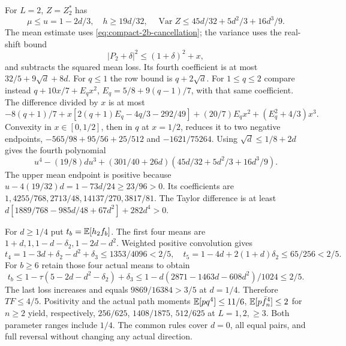 For $L=2$, $Z=Z_2^*$ has
\[
 \mu\le u=1-2d/3,\quad h\ge19d/32,\quad
 \operatorname{Var}Z\le45d/32+5d^2/3+16d^3/9.
\]
The mean estimate uses \eqref{eq:compact-2b-cancellation}; the variance
uses the real-shift bound
\[
 |P_2+\delta|^2\le(1+\delta)^2+x,
\]
and subtracts the squared mean loss. Its fourth coefficient is at most $32/5+9\sqrt d+8d$.
For $q\le1$ the row bound is $q+2\sqrt d$.
For $1\le q\le2$ compare instead
$q+10x/7+E_qx^2$, $E_q=5/8+9(q-1)/7$, with that same coefficient.
The difference divided by $x$ is at most
\[
 -8(q+1)/7+x[2(q+1)E_q-4q/3-292/49]
                  +(20/7)E_qx^2+(E_q^2+4/3)x^3.
\]
Convexity in $x\in[0,1/2]$, then in $q$ at $x=1/2$, reduces it
to two negative endpoints, $-565/98+95/56+25/512$ and $-1621/75264$.
Using $\sqrt d\le1/8+2d$ gives the fourth polynomial
\[
 u^4-(19/8)du^3+(301/40+26d)(45d/32+5d^2/3+16d^3/9).
\]
The upper mean endpoint is positive because
$u-4(19/32)d=1-73d/24\ge23/96>0$.
Its coefficients are $1,4255/768,2713/48,14137/270,3817/81$.
The Taylor difference is at least
$d[1889/768-985d/48+67d^2]+282d^4>0$.

For $d\ge1/4$ put $t_b=\mathbb E[h_2f_b]$.
The first four means are $1+d,1,1-d-\delta_{2},1-2d-d^2$.
Weighted positive convolution gives
\[
 t_4=1-3d+\delta_{2}-d^2+\delta_{3}\le1353/4096<2/5,
 \quad t_5=1-4d+2(1+d)\delta_{2}\le65/256<2/5.
\]
For $b\ge6$ retain those four actual means to obtain
\[
 t_b\le1-\tau(5-2d-d^2-\delta_{2})+\delta_{3}
 \le1-d(2871-1463d-608d^2)/1024\le2/5.
\]
The last loss increases and equals $9869/16384>3/5$ at $d=1/4$.
Therefore $TF\le4/5$. Positivity and the actual path moments
$\mathbb E[pq^4]\le11/6$, $\mathbb E[p\bar f_{n}^4]\le2$ for $n\ge2$ yield, respectively,
$256/625$, $1408/1875$, $512/625$ at $L=1,2,\ge3$.
Both parameter ranges include $1/4$. The common rules cover $d=0$,
all equal pairs, and full reversal without changing any actual direction.
